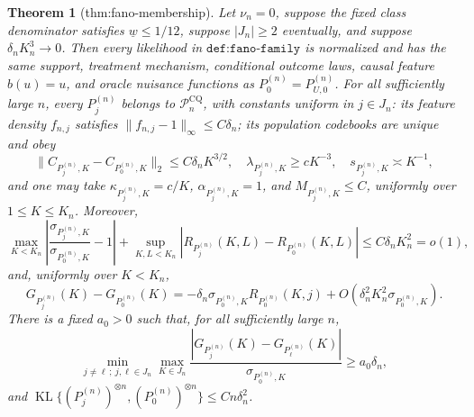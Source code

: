 \documentclass{article}
\newtheorem{theorem}{Theorem}
\begin{document}
\begin{theorem}[thm:fano-membership]\label{thm:fano-membership}
Let \(\nu_n=0\), suppose the fixed class denominator satisfies \(\underline w\leq1/12\), suppose \(|J_n|\geq2\) eventually, and suppose \(\delta_nK_n^3\to0\).  Then every likelihood in \(\texttt{def:fano-family}\) is normalized and has the same support, treatment mechanism, conditional outcome laws, causal feature \(b(u)=u\), and oracle nuisance functions as \(P_0^{(n)}=P_{U,0}^{(n)}\).  For all sufficiently large \(n\), every \(P_j^{(n)}\) belongs to \(\mathcal P_n^{\mathrm{CQ}}\), with constants uniform in \(j\in J_n\): its feature density \(f_{n,j}\) satisfies \(\|f_{n,j}-1\|_\infty\leq C\delta_n\); its population codebooks are unique and obey
\[
 \|C_{P_j^{(n)},K}-C_{P_0^{(n)},K}\|_2\leq C\delta_nK^{3/2},\quad
 \lambda_{P_j^{(n)},K}\geq cK^{-3},\quad
 s_{P_j^{(n)},K}\asymp K^{-1},
\]
and one may take \(\kappa_{P_j^{(n)},K}=c/K\), \(\alpha_{P_j^{(n)},K}=1\), and \(M_{P_j^{(n)},K}\leq C\), uniformly over \(1\leq K\leq K_n\).  Moreover,
\[
 \max_{K<K_n}\left|\frac{\sigma_{P_j^{(n)},K}}{\sigma_{P_0^{(n)},K}}-1\right|
 +\sup_{K,L<K_n}|R_{P_j^{(n)}}(K,L)-R_{P_0^{(n)}}(K,L)|
 \leq C\delta_nK_n^2=o(1),
\]
and, uniformly over \(K<K_n\),
\[
 G_{P_j^{(n)}}(K)-G_{P_0^{(n)}}(K)
 =-\delta_n\sigma_{P_0^{(n)},K}R_{P_0^{(n)}}(K,j)
 +O\!\left(\delta_n^2K_n^2\sigma_{P_0^{(n)},K}\right).
\]
There is a fixed \(a_0>0\) such that, for all sufficiently large \(n\),
\[
 \min_{j\ne\ell\,;\ j,\ell\in J_n}\max_{K\in J_n}
 \frac{|G_{P_j^{(n)}}(K)-G_{P_\ell^{(n)}}(K)|}{\sigma_{P_0^{(n)},K}}
 \geq a_0\delta_n,
\]
and \(\operatorname{KL}\{(P_j^{(n)})^{\otimes n},(P_0^{(n)})^{\otimes n}\}\leq Cn\delta_n^2\).
\end{theorem}
\end{document}
